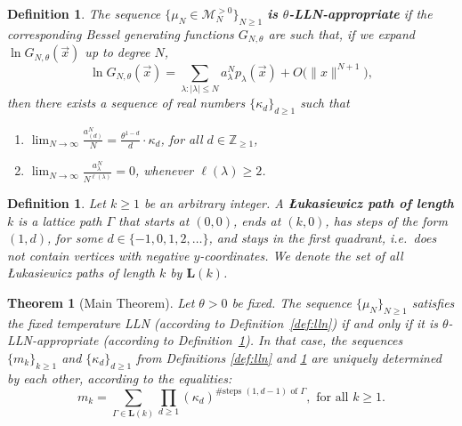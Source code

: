 \documentclass[11pt]{article}
\theoremstyle{plain}
\newtheorem{theorem}[lemma]{Theorem}
\newtheorem{definition}[lemma]{Definition}
\newcommand{\Z}{\mathbb Z}
\newcommand{\Luk}{\mathbf L}
\newcommand{\la}{\lambda}
\newcommand{\M}{\mathcal M}
\newcommand{\vecx}{\vec{x}}
\begin{document}
\begin{definition}\label{def:appropriate}
    The sequence $\{\mu_N\in\M_N^{>0}\}_{N\ge 1}$ \textbf{is $\theta$-LLN-appropriate} if the corresponding Bessel generating functions $G_{N,\theta}$ are such that, if we expand $\ln{G_{N,\theta}(\vecx)}$ up to degree $N$,
    \begin{equation}\label{eq:taylor_2}
    \ln{G_{N,\theta}(\vecx)} = \sum_{\la\colon|\la|\le N}{ a_\la^N p_\la(\vecx) }+O\big(\|x\|^{N+1}\big),
    \end{equation}
    then there exists a sequence of real numbers $\{\kappa_d\}_{d\ge 1}$ such that
    \begin{enumerate}[label=(\alph*)]
        \item $\displaystyle\lim_{N\to\infty}{\frac{a_{(d)}^N}{N}} = \frac{\theta^{1-d}}{d}\cdot\kappa_d$, for all $d\in\Z_{\ge 1}$,
        \item $\displaystyle\lim_{N\to\infty}{\frac{a_\la^N}{N^{\ell(\la)}}}=0$, whenever $\ell(\la)\ge 2$.
    \end{enumerate}
\end{definition}

\medskip

\begin{definition}
    Let $k\ge 1$ be an arbitrary integer. A \textbf{Łukasiewicz path of length $k$} is a lattice path $\Gamma$ that starts at $(0,0)$, ends at $(k,0)$, has steps of the form $(1,d)$, for some $d\in\{-1,0,1,2,\dots\}$, and stays in the first quadrant, i.e.~does not contain vertices with negative $y$-coordinates. We denote the set of all Łukasiewicz paths of length $k$ by $\mathbf{L}(k)$.
\end{definition}

\begin{theorem}[Main Theorem]\label{thm:main}
    Let $\theta>0$ be fixed.
    The sequence $\{\mu_N\}_{N\ge 1}$ satisfies the fixed temperature LLN (according to Definition~\ref{def:lln}) if and only if it is $\theta$-LLN-appropriate (according to Definition~\ref{def:appropriate}). In that case, the sequences $\{m_k\}_{k\ge 1}$ and $\{\kappa_d\}_{d\ge 1}$ from Definitions \ref{def:lln} and \ref{def:appropriate} are uniquely determined by each other, according to the equalities:
    \begin{equation}\label{eq_fixedtempmoment-cumulant}
        m_k = \sum_{\Gamma\in\Luk(k)}{ \prod_{d\ge 1}{(\kappa_d)^{\#\text{steps $(1,d-1)$ of }\Gamma}} },\text{ for all }k\ge 1.
    \end{equation}
\end{theorem}
\end{document}
